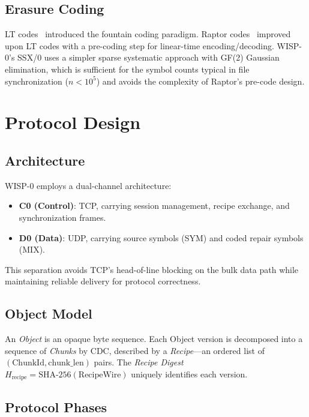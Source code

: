 \documentclass[11pt,twocolumn]{article}
\theoremstyle{definition}
\begin{document}
\subsection{Erasure Coding}

LT codes~\cite{lt-codes} introduced the fountain coding paradigm.
Raptor codes~\cite{raptor} improved upon LT codes with a pre-coding
step for linear-time encoding/decoding. WISP-0's SSX/0 uses a simpler
sparse systematic approach with GF(2) Gaussian elimination, which is
sufficient for the symbol counts typical in file synchronization
($n < 10^5$) and avoids the complexity of Raptor's pre-code design.


\section{Protocol Design}
\label{sec:protocol}

\subsection{Architecture}

WISP-0 employs a dual-channel architecture:

\begin{itemize}
  \item \textbf{C0 (Control)}: TCP, carrying session management,
    recipe exchange, and synchronization frames.
  \item \textbf{D0 (Data)}: UDP, carrying source symbols (SYM) and
    coded repair symbols (MIX).
\end{itemize}

This separation avoids TCP's head-of-line blocking on the bulk data
path while maintaining reliable delivery for protocol correctness.

\subsection{Object Model}

An \emph{Object} is an opaque byte sequence. Each Object version is
decomposed into a sequence of \emph{Chunks} by CDC, described by a
\emph{Recipe}---an ordered list of $(\text{ChunkId}, \text{chunk\_len})$
pairs. The \emph{Recipe Digest} $H_{\text{recipe}} =
\text{SHA-256}(\text{RecipeWire})$ uniquely identifies each version.

\subsection{Protocol Phases}
\end{document}
